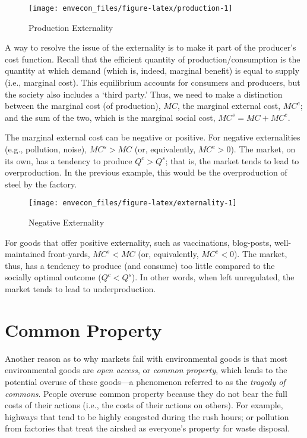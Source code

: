 \documentclass[
]{book}
\begin{document}
\begin{figure}

{\centering \texttt{[image: envecon\_files/figure-latex/production-1]} 

}

\caption{Production Externality}\label{fig:production}
\end{figure}

A way to resolve the issue of the externality is to make it part of the producer's cost function. Recall that the efficient quantity of production/consumption is the quantity at which demand (which is, indeed, marginal benefit) is equal to supply (i.e., marginal cost). This equilibrium accounts for consumers and producers, but the society also includes a `third party.' Thus, we need to make a distinction between the marginal cost (of production), \(MC\), the marginal external cost, \(MC^e\); and the sum of the two, which is the marginal social cost, \(MC^s = MC+MC^e\).

The marginal external cost can be negative or positive. For negative externalities (e.g., pollution, noise), \(MC^s > MC\) (or, equivalently, \(MC^e > 0\)). The market, on its own, has a tendency to produce \(Q^c>Q^s\); that is, the market tends to lead to overproduction. In the previous example, this would be the overproduction of steel by the factory.

\begin{figure}

{\centering \texttt{[image: envecon\_files/figure-latex/externality-1]} 

}

\caption{Negative Externality}\label{fig:externality}
\end{figure}

For goods that offer positive externality, such as vaccinations, blog-posts, well-maintained front-yards, \(MC^s < MC\) (or, equivalently, \(MC^e < 0\)). The market, thus, has a tendency to produce (and consume) too little compared to the socially optimal outcome (\(Q^c < Q^s\)). In other words, when left unregulated, the market tends to lead to underproduction.

\hypertarget{common-property}{%
\section{Common Property}\label{common-property}}

Another reason as to why markets fail with environmental goods is that most environmental goods are \emph{open access}, or \emph{common property}, which leads to the potential overuse of these goods---a phenomenon referred to as the \emph{tragedy of commons}. People overuse common property because they do not bear the full costs of their actions (i.e., the costs of their actions on others). For example, highways that tend to be highly congested during the rush hours; or pollution from factories that treat the airshed as everyone's property for waste disposal.
\end{document}
